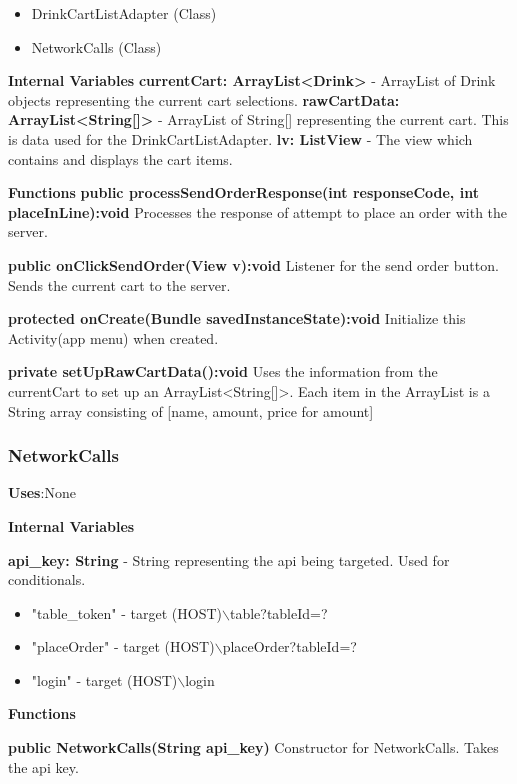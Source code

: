 \documentclass [10pt]{article}
\begin{document}
\begin{itemize}
	\item DrinkCartListAdapter (Class)
	\item NetworkCalls (Class)
\end{itemize}

\textbf{Internal Variables}
\textbf{currentCart: ArrayList<Drink>} - ArrayList of Drink objects representing the current cart selections.
\textbf{rawCartData: ArrayList<String[]>} - ArrayList of String[] representing the current cart. This is data used for the DrinkCartListAdapter.
\textbf{lv: ListView} - The view which contains and displays the cart items.

\textbf{Functions}
\textbf{public processSendOrderResponse(int responseCode, int placeInLine):void}
Processes the response of attempt to place an order with the server.

\textbf{public onClickSendOrder(View v):void}
Listener for the send order button. Sends the current cart to the server.

\textbf{protected onCreate(Bundle savedInstanceState):void}
Initialize this Activity(app menu) when created.

\textbf{private setUpRawCartData():void}
Uses the information from the currentCart to set up an ArrayList<String[]>. Each item in the ArrayList is a String array consisting of [name, amount, price for amount]

\subsubsection{NetworkCalls}

\textbf{Uses}:None

\textbf{Internal Variables}

\textbf{api\_key: String} - String representing the api being targeted. Used for conditionals.

\begin{itemize}
	\item "table\_token" - target (HOST)$\backslash$table?tableId=?
	\item "placeOrder" - target (HOST)$\backslash$placeOrder?tableId=?
	\item "login" - target (HOST)$\backslash$login
\end{itemize}

\textbf{Functions}

\textbf{public NetworkCalls(String api\_key)}
Constructor for NetworkCalls. Takes the api key.
\end{document}
